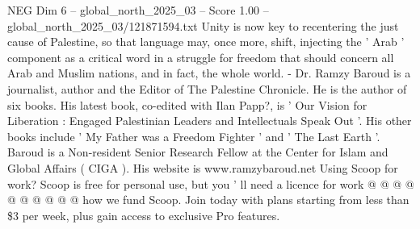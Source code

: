 \begin{textsample}{NEG Dim 6 – global\_north\_2025\_03 – Score 1.00 – global\_north\_2025\_03/121871594.txt}
Unity is now key to recentering the just cause of Palestine, so that language may, once more, shift, injecting the ' Arab ' component as a critical word in a struggle for freedom that should concern all Arab and Muslim nations, and in fact, the whole world. - Dr.
Ramzy Baroud is a journalist, author and the Editor of The Palestine Chronicle.
He is the author of six books.
His latest book, co-edited with Ilan Papp?, is ' Our Vision for Liberation : Engaged Palestinian Leaders and Intellectuals Speak Out '.
His other books include ' My Father was a Freedom Fighter ' and ' The Last Earth '.
Baroud is a Non-resident Senior Research Fellow at the Center for Islam and Global Affairs ( CIGA ).
His website is www.ramzybaroud.net Using Scoop for work?
Scoop is free for personal use, but you ' ll need a licence for work @ @ @ @ @ @ @ @ @ @ how we fund Scoop.
Join today with plans starting from less than \$3 per week, plus gain access to exclusive Pro features.

\end{textsample}
